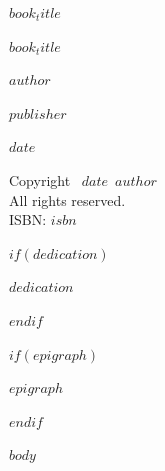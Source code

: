 \documentclass[12pt,openany]{memoir}
\def\booktitle{$book_title$}
\def\bookauthor{$author$}
\def\bookdate{$date$}
\def\bookpublisher{$publisher$}
\begin{document}
\thispagestyle{empty}
\begin{center}
\vspace*{2in}
{\Huge\scshape\booktitle\par}
\end{center}

\clearpage
\thispagestyle{empty}
\begin{center}
\vspace*{1in}
{\Huge\scshape\booktitle\par}
\vspace{2in}
{\Large\scshape\bookauthor\par}
\vfill
{\large\scshape\bookpublisher\par}
{\large\scshape\bookdate\par}
\end{center}

\clearpage
\thispagestyle{empty}
\vspace*{\fill}
\begin{center}
Copyright \textcopyright\ \bookdate\ \bookauthor\\
All rights reserved.\\
ISBN: $isbn$
\end{center}
\vspace*{\fill}

$if(dedication)$
\clearpage
\thispagestyle{empty}
\vspace*{3in}
\begin{center}
\textit{$dedication$}
\end{center}
$endif$

$if(epigraph)$
\clearpage
\begin{center}
\textit{$epigraph$}
\end{center}
$endif$

\clearpage
\tableofcontents*

\clearpage
\mainmatter

$body$
\end{document}
